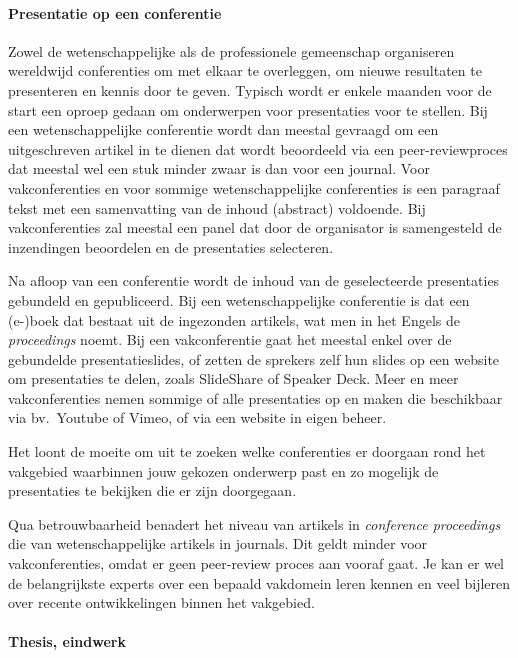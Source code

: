 \paragraph{Presentatie op een conferentie}

Zowel de wetenschappelijke als de professionele gemeenschap organiseren wereldwijd conferenties om met elkaar te overleggen, om nieuwe resultaten te presenteren en kennis door te geven. Typisch wordt er enkele maanden voor de start een oproep gedaan om onderwerpen voor presentaties voor te stellen. Bij een wetenschappelijke conferentie wordt dan meestal gevraagd om een uitgeschreven artikel in te dienen dat wordt beoordeeld via een peer-reviewproces dat meestal wel een stuk minder zwaar is dan voor een journal. Voor vakconferenties en voor sommige wetenschappelijke conferenties is een paragraaf tekst met een samenvatting van de inhoud (abstract) voldoende. Bij vakconferenties zal meestal een panel dat door de organisator is samengesteld de inzendingen beoordelen en de presentaties selecteren.

Na afloop van een conferentie wordt de inhoud van de geselecteerde presentaties gebundeld en gepubliceerd. Bij een wetenschappelijke conferentie is dat een {(e-)boek} dat bestaat uit de ingezonden artikels, wat men in het Engels de \emph{proceedings} noemt. Bij een vakconferentie gaat het meestal enkel over de gebundelde presentatieslides, of zetten de sprekers zelf hun slides op een website om presentaties te delen, zoals SlideShare of Speaker Deck. Meer en meer vakconferenties nemen sommige of alle presentaties op en maken die beschikbaar via bv.~Youtube of Vimeo, of via een website in eigen beheer.

Het loont de moeite om uit te zoeken welke conferenties er doorgaan rond het vakgebied waarbinnen jouw gekozen onderwerp past en zo mogelijk de presentaties te bekijken die er zijn doorgegaan.

Qua betrouwbaarheid benadert het niveau van artikels in \emph{conference pro\-ceed\-ings} die van wetenschappelijke artikels in journals. Dit geldt minder voor vakconferenties, omdat er geen peer-review proces aan vooraf gaat. Je kan er wel de belangrijkste experts over een bepaald vakdomein leren kennen en veel bijleren over recente ontwikkelingen binnen het vakgebied.

\paragraph{Thesis, eindwerk}

